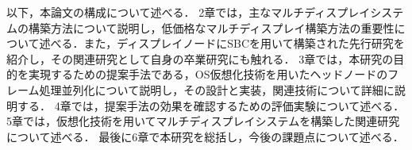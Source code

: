 以下，本論文の構成について述べる．
2章では，主なマルチディスプレイシステムの構築方法について説明し，低価格なマルチディスプレイ構築方法の重要性について述べる．また，ディスプレイノードにSBCを用いて構築された先行研究を紹介し，その関連研究として自身の卒業研究にも触れる．
3章では，本研究の目的を実現するための提案手法である，OS仮想化技術を用いたヘッドノードのフレーム処理並列化について説明し，その設計と実装，関連技術について詳細に説明する．
4章では，提案手法の効果を確認するための評価実験について述べる．
5章では，仮想化技術を用いてマルチディスプレイシステムを構築した関連研究について述べる．
最後に6章で本研究を総括し，今後の課題点について述べる．